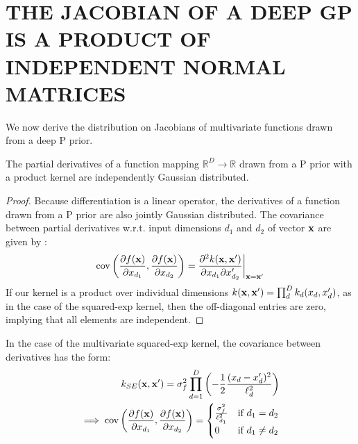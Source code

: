 \documentclass[twoside]{article}
\makeatletter
\newlength{\nonHumbleHeight}
\def\@humbleformat#1{{\settoheight{\nonHumbleHeight}{#1}\resizebox{!}{0.94\nonHumbleHeight}{#1}}}%
\def\humble#1{\@humbleformat{#1}}%
\newcommand{\gp}{{\humble GP}}
\newcommand{\sectiondist}{}
\makeatother
\begin{document}
\section{THE JACOBIAN OF A DEEP GP IS A PRODUCT OF INDEPENDENT NORMAL MATRICES}
\sectiondist
\label{sec:theorem}

We now derive the distribution on Jacobians of multivariate functions drawn from a deep \gp{} prior.

\begin{lemma}
\label{thm:deriv-ind}
The partial derivatives of a function mapping $\mathbb{R}^D \rightarrow \mathbb{R}$ drawn from a \gp{} prior with a product kernel are independently Gaussian distributed.
\end{lemma}
%
\begin{proof}
Because differentiation is a linear operator, the derivatives of a function drawn from a \gp{} prior are also jointly Gaussian distributed.  The covariance between partial derivatives w.r.t. input dimensions $d_1$ and $d_2$ of vector ${\bf{x}}$ are given by \citet{Solak03derivativeobservations}:
%
\begin{align}
\operatorname{cov} \left( \frac{\partial f({\bf{x}})}{\partial x_{d_1}}, \frac{\partial f({\bf{x}})}{\partial x_{d_2}} \right) 
= \frac{\partial^2 k({\bf{x}}, {\bf{x}}')}{\partial x_{d_1} \partial x_{d_2}'} \bigg|_{{\bf{x}}={\bf{x}}'}
\end{align}
%
If our kernel is a product over individual dimensions $k({\bf{x}}, {\bf{x}}') = \prod_d^D k_d(x_d, x_d')$, as in the case of the squared-exp kernel, then the off-diagonal entries are zero, implying that all elements are independent.
\end{proof}

In the case of the multivariate squared-exp kernel, the covariance between derivatives has the form:
%
\begin{align}
k_{SE}({\bf{x}}, {\bf{x}}') = \sigma^2_f \prod_{d=1}^D \left(-\frac{1}{2} \frac{(x_d - x_d')^2}{\ell_d^2} \right) \nonumber \\
 \implies 
\operatorname{cov} \left( \frac{\partial f({\bf{x}})}{\partial x_{d_1}}, \frac{\partial f({\bf{x}})}{\partial x_{d_2}} \right) =
\begin{cases} 
\frac{\sigma^2_f}{\ell_{d_1}^2} & \mbox{if } d_1 = d_2 \\ 
0 & \mbox{if } d_1 \neq d_2 \end{cases}
\end{align}
\end{document}
